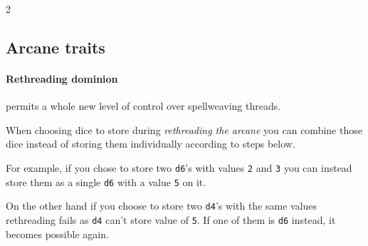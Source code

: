 \begin{multicols*}{2}

\subsection*{Arcane traits}

\paragraph{Rethreading dominion} permits a whole new level of control over spellweaving threads.

When choosing dice to store during \emph{rethreading the arcane} you can combine those dice instead of storing them individually according to steps below.


For example, if you chose to store two \texttt{d6}'s with values \texttt{2} and \texttt{3} you can instead store them as a single \texttt{d6} with a value \texttt{5} on it. 

On the other hand if you choose to store two \texttt{d4}'s with the same values rethreading fails as \texttt{d4} can't store value of \texttt{5}. 
If one of them is \texttt{d6} instead, it becomes possible again.

\end{multicols*}
